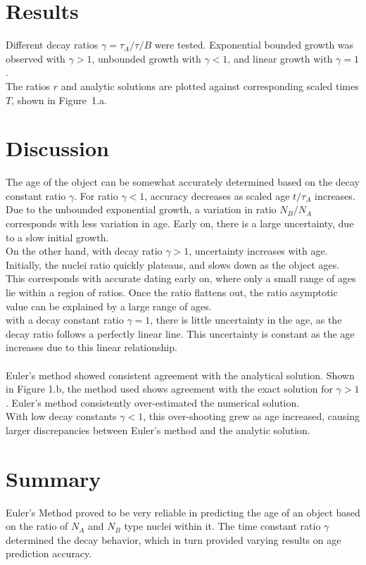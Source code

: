 \documentclass{article}
\begin{document}
	\section{Results}
	Different decay ratios $\gamma = \tau_A/\tau/B$ were tested. Exponential bounded growth was observed with $\gamma>1$, unbounded growth with $\gamma<1$, and linear growth with $\gamma = 1$. 
	\\ \indent The ratios $r$ and analytic solutions are plotted against corresponding scaled times $T$, shown in Figure~1.a.\vspace{-1mm}
	\section{Discussion}
	The age of the object can be somewhat accurately determined based on the decay constant ratio $\gamma$. For ratio $\gamma<1$, accuracy decreases as scaled age $t/\tau_A$ increases. Due to the unbounded exponential growth, a variation in ratio $N_B/N_A$ corresponds with less variation in age. Early on, there is a large uncertainty, due to a slow initial growth. 
	\\ \indent On the other hand, with decay ratio $\gamma>1$, uncertainty increases with age. Initially, the nuclei ratio quickly plateaus, and slows down as the object ages. This corresponds with accurate dating early on, where only a small range of ages  lie within a region of ratios. Once the ratio flattens out, the ratio asymptotic value can be explained by a large range of ages. 
	\\ \indent with a decay constant ratio $\gamma=1$, there is little uncertainty in the age, as the decay ratio follows a perfectly linear line. This uncertainty is constant as the age increases due to this linear relationship. 
	\\\\ Euler's method showed consistent agreement with the analytical solution. Shown in Figure 1.b, the method used shows agreement with the exact solution for $\gamma>1$. Euler's method consistently over-estimated the numerical solution. 
	\\ \indent With low decay constants $\gamma<1$, this over-shooting grew as age increased, causing larger discrepancies between Euler's method and the analytic solution. 
	\section{Summary}
	Euler's Method proved to be very reliable in predicting the age of an object based on the ratio of $N_A$ and $N_B$ type nuclei within it. The time constant ratio $\gamma$ determined the decay behavior, which in turn provided varying results on age prediction accuracy. 
	\pagebreak
\end{document}

